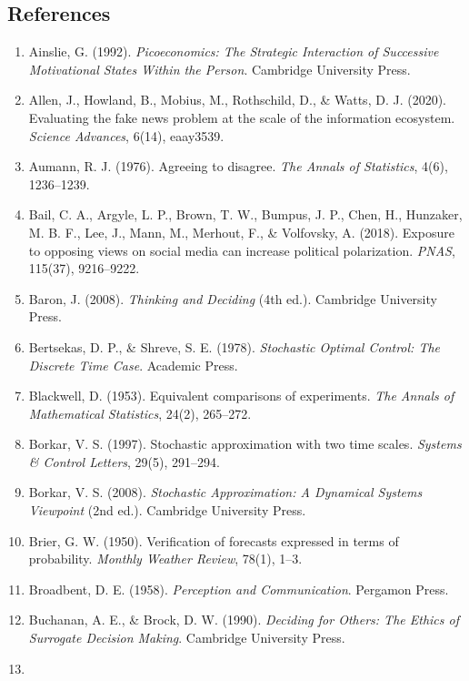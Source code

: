 \documentclass[
  11pt]{article}
\providecommand{\tightlist}{%
  \setlength{\itemsep}{0pt}\setlength{\parskip}{0pt}}
\begin{document}
\subsection{References}\label{references}

\begin{enumerate}
\def\labelenumi{\arabic{enumi}.}
\tightlist
\item
  Ainslie, G. (1992). \emph{Picoeconomics: The Strategic Interaction of
  Successive Motivational States Within the Person}. Cambridge
  University Press.
\item
  Allen, J., Howland, B., Mobius, M., Rothschild, D., \& Watts, D. J.
  (2020). Evaluating the fake news problem at the scale of the
  information ecosystem. \emph{Science Advances}, 6(14), eaay3539.
\item
  Aumann, R. J. (1976). Agreeing to disagree. \emph{The Annals of
  Statistics}, 4(6), 1236--1239.
\item
  Bail, C. A., Argyle, L. P., Brown, T. W., Bumpus, J. P., Chen, H.,
  Hunzaker, M. B. F., Lee, J., Mann, M., Merhout, F., \& Volfovsky, A.
  (2018). Exposure to opposing views on social media can increase
  political polarization. \emph{PNAS}, 115(37), 9216--9222.
\item
  Baron, J. (2008). \emph{Thinking and Deciding} (4th ed.). Cambridge
  University Press.
\item
  Bertsekas, D. P., \& Shreve, S. E. (1978). \emph{Stochastic Optimal
  Control: The Discrete Time Case}. Academic Press.
\item
  Blackwell, D. (1953). Equivalent comparisons of experiments. \emph{The
  Annals of Mathematical Statistics}, 24(2), 265--272.
\item
  Borkar, V. S. (1997). Stochastic approximation with two time scales.
  \emph{Systems \& Control Letters}, 29(5), 291--294.
\item
  Borkar, V. S. (2008). \emph{Stochastic Approximation: A Dynamical
  Systems Viewpoint} (2nd ed.). Cambridge University Press.
\item
  Brier, G. W. (1950). Verification of forecasts expressed in terms of
  probability. \emph{Monthly Weather Review}, 78(1), 1--3.
\item
  Broadbent, D. E. (1958). \emph{Perception and Communication}. Pergamon
  Press.
\item
  Buchanan, A. E., \& Brock, D. W. (1990). \emph{Deciding for Others:
  The Ethics of Surrogate Decision Making}. Cambridge University Press.
\item

\end{enumerate}
\end{document}
